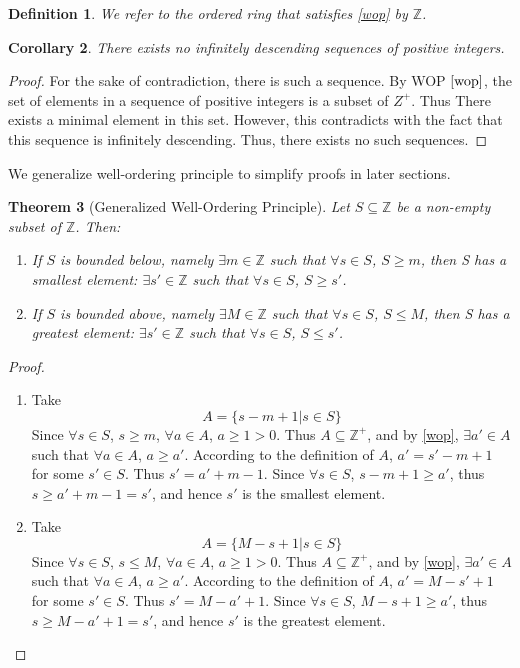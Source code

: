 \documentclass{article}
\newcommand{\Z}{\mathbb{Z}}
\newcommand{\FTSOC}{For the sake of contradiction}
\newcommand{\st}{such that }
\newtheorem{thm}{Theorem}[section]
\newtheorem{defn}[thm]{Definition}
\newtheorem{cor}[thm]{Corollary}
\begin{document}
\begin{defn}
We refer to the ordered ring that satisfies \ref{wop} by $\Z$. 
\end{defn}

\begin{cor}
\label{no-inf}
There exists no infinitely descending sequences of positive integers.
\end{cor}
\begin{proof}
\FTSOC, there is such a sequence. By WOP $\ref{wop}$, the set of elements in a sequence of positive integers is a subset of $Z^{+}$. Thus There exists a minimal element in this set. However, this contradicts with the fact that this sequence is infinitely descending. Thus, there exists no such sequences.
\end{proof}

We generalize well-ordering principle to simplify proofs in later sections. 

\begin{thm}[Generalized Well-Ordering Principle]
\label{wop2}
Let $S\subseteq \Z$ be a non-empty subset of $\Z$. Then:
\begin{enumerate}
    \item If $S$ is bounded below, namely $\exists m\in \Z$ \st $\forall s\in S$, $S\geq m$, then S has a smallest element: $\exists s'\in \Z$ \st $\forall s\in S$, $S\geq s'$.
    \item If $S$ is bounded above, namely $\exists M\in \Z$ \st $\forall s\in S$, $S\leq M$, then S has a greatest element: $\exists s'\in \Z$ \st $\forall s\in S$, $S\leq s'$.
\end{enumerate}
\end{thm}

\begin{proof}
\begin{enumerate}
    \item Take
    \begin{equation}
        A=\{s-m+1|s\in S\}
    \end{equation}
    Since $\forall s\in S$, $s\geq m$, $\forall a\in A$, $a\geq 1 >0$. Thus $A\subseteq \Z^{+}$, and by \ref{wop}, $\exists a'\in A$ \st $\forall a\in A$, $a\geq a'$. According to the definition of $A$, $a'=s'-m+1$ for some $s'\in S$. Thus $s'=a'+m-1$. Since $\forall s\in S$, $s-m+1\geq a'$, thus $s\geq a'+m-1=s'$, and hence $s'$ is the smallest element. 
    
    \item Take 
    \begin{equation}
        A=\{M-s+1|s\in S\}
    \end{equation}
    Since $\forall s\in S$, $s\leq M$, $\forall a\in A$, $a\geq 1 >0$. Thus $A\subseteq \Z^{+}$, and by \ref{wop}, $\exists a'\in A$ \st $\forall a\in A$, $a\geq a'$. According to the definition of $A$, $a'=M-s'+1$ for some $s'\in S$. Thus $s'=M-a'+1$. Since $\forall s\in S$, $M-s+1\geq a'$, thus $s\geq M-a'+1=s'$, and hence $s'$ is the greatest element. 
\end{enumerate}

\end{proof}
\end{document}
